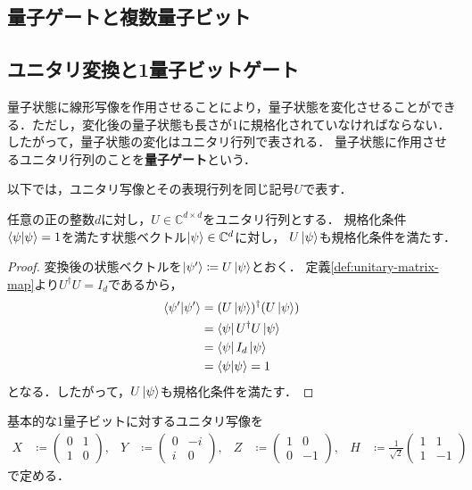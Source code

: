 \begin{samepage}
\section{量子ゲートと複数量子ビット}
\label{sec:gates-composite}

\subsection{ユニタリ変換と1量子ビットゲート}

量子状態に線形写像を作用させることにより，量子状態を変化させることができる．ただし，変化後の量子状態も長さが$1$に規格化されていなければならない．したがって，量子状態の変化はユニタリ行列で表される．
量子状態に作用させるユニタリ行列のことを\textbf{量子ゲート}という．
\end{samepage}

以下では，ユニタリ写像とその表現行列を同じ記号$U$で表す．

\begin{prop}[ユニタリ行列による規格化条件の保存]
  任意の正の整数$d$に対し，$U\in\mathbb C^{d\times d}$をユニタリ行列とする．
  規格化条件$\braket{\psi|\psi}=1$を満たす状態ベクトル$\ket{\psi}\in\mathbb C^d$に対し，
  $U\ket{\psi}$も規格化条件を満たす．
  \label{prop:unitary-preserves-normalization}
\end{prop}
\begin{proof}
  変換後の状態ベクトルを$\ket{\psi'}\coloneq U\ket{\psi}$とおく．
  定義\ref{def:unitary-matrix-map}より$U^\dagger U=I_d$であるから，
  \begin{equation*}
    \begin{aligned}
      \braket{\psi'|\psi'}
      &=(U\ket{\psi})^\dagger(U\ket{\psi}) \\
      &=\bra{\psi}U^\dagger U\ket{\psi} \\
      &=\bra{\psi}I_d\ket{\psi} \\
      &=\braket{\psi|\psi}=1
    \end{aligned}
  \end{equation*}
  となる．したがって，$U\ket{\psi}$も規格化条件を満たす．
\end{proof}

\begin{defi}
  基本的な1量子ビットに対するユニタリ写像を
  \begin{align*}
    X & \coloneq\begin{pmatrix}0&1\\1&0\end{pmatrix},                    &
    Y & \coloneq\begin{pmatrix}0&-i\\i&0\end{pmatrix}, &
    Z & \coloneq\begin{pmatrix}1&0\\0&-1\end{pmatrix},                   &
    H & \coloneq\frac1{\sqrt2}\begin{pmatrix}1&1\\1&-1\end{pmatrix}
  \end{align*}
  で定める．
\end{defi}


